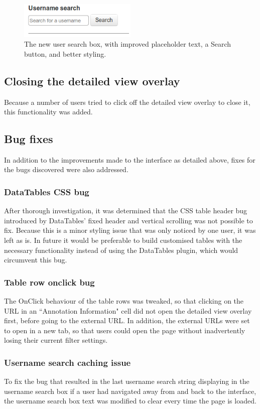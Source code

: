 \begin{figure}[h!]
    \centering
    \includegraphics[width=0.5\textwidth]{Figures/V2/usernamenew.png}
 \caption{The new user search box, with improved placeholder text, a Search button, and better styling.}
\end{figure}


\subsection{Closing the detailed view overlay}
Because a number of users tried to click off the detailed view overlay to close it, this functionality was added. 

\subsection{Bug fixes}
In addition to the improvements made to the interface as detailed above, fixes for the bugs discovered were also addressed. 

\subsubsection{DataTables CSS bug}
After thorough investigation, it was determined that the CSS table header bug introduced by DataTables' fixed header and vertical scrolling was not possible to fix. Because this is a minor styling issue that was only noticed by one user, it was left as is. In future it would be preferable to build customised tables with the necessary functionality instead of using the DataTables plugin, which would circumvent this bug.

\subsubsection{Table row onclick bug}
The OnClick behaviour of the table rows was tweaked, so that clicking on the URL in an ``Annotation Information" cell did not open the detailed view overlay first, before going to the external URL. In addition, the external URLs were set to open in a new tab, so that users could open the page without inadvertently losing their current filter settings. 

\subsubsection{Username search caching issue}
To fix the bug that resulted in the last username search string displaying in the username search box if a user had navigated away from and back to the interface, the username search box text was modified to clear every time the page is loaded. 

